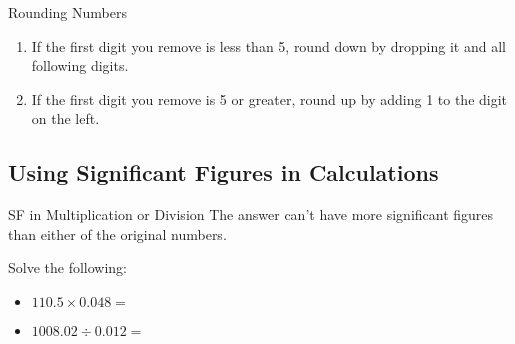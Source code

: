 \documentclass[notes=only]{beamer}
\begin{document}
\begin{frame}{Rounding Numbers}
	\begin{enumerate}
		\item<1-> If the first digit you remove is less than 5, round
			down by dropping it and all following digits.
		\item<2-> If the first digit you remove is 5 or greater, round
			up by adding 1 to the digit on the left.
	\end{enumerate}

\end{frame}

\subsection{Using Significant Figures in Calculations}

\begin{frame}[t]{SF in Multiplication or Division}
	The answer can't have more \alert{significant figures} than either of
	the original numbers.

	\bigskip

	\begin{example}
		Solve the following:
		\begin{itemize}
			\item $110.5 \times 0.048 =$ 

				\bigskip

			\item $1008.02 \div 0.012 =$
		\end{itemize}
	\end{example}
\end{frame}
\end{document}
